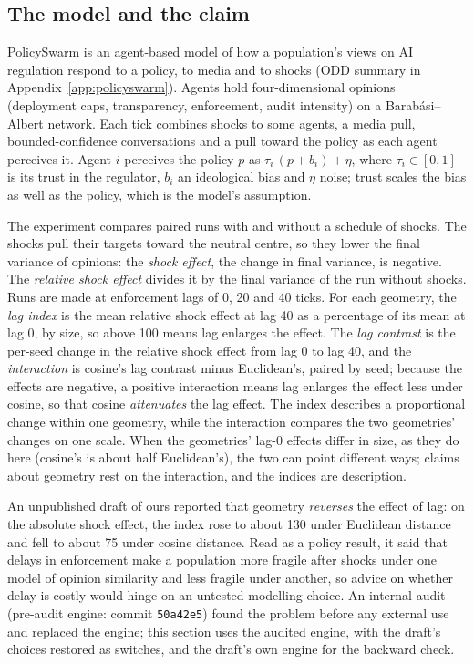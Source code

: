 \documentclass[11pt]{article}
\begin{document}
\subsection{The model and the claim}
PolicySwarm \citep{policyswarm} is an agent-based model of how a population's views on AI regulation respond to a policy, to media and to shocks (ODD summary in Appendix~\ref{app:policyswarm}).
Agents hold four-dimensional opinions (deployment caps, transparency, enforcement, audit intensity) on a Barab\'asi--Albert network.
Each tick combines shocks to some agents, a media pull, bounded-confidence conversations and a pull toward the policy as each agent perceives it.
Agent $i$ perceives the policy $p$ as $\tau_i\,(p + b_i) + \eta$, where $\tau_i \in [0,1]$ is its trust in the regulator, $b_i$ an ideological bias and $\eta$ noise; trust scales the bias as well as the policy, which is the model's assumption.

The experiment compares paired runs with and without a schedule of shocks.
The shocks pull their targets toward the neutral centre, so they lower the final variance of opinions: the \emph{shock effect}, the change in final variance, is negative.
The \emph{relative shock effect} divides it by the final variance of the run without shocks.
Runs are made at enforcement lags of 0, 20 and 40 ticks.
For each geometry, the \emph{lag index} is the mean relative shock effect at lag 40 as a percentage of its mean at lag 0, by size, so above 100 means lag enlarges the effect.
The \emph{lag contrast} is the per-seed change in the relative shock effect from lag 0 to lag 40, and the \emph{interaction} is cosine's lag contrast minus Euclidean's, paired by seed; because the effects are negative, a positive interaction means lag enlarges the effect less under cosine, so that cosine \emph{attenuates} the lag effect.
The index describes a proportional change within one geometry, while the interaction compares the two geometries' changes on one scale.
When the geometries' lag-0 effects differ in size, as they do here (cosine's is about half Euclidean's), the two can point different ways; claims about geometry rest on the interaction, and the indices are description.

An unpublished draft of ours reported that geometry \emph{reverses} the effect of lag: on the absolute shock effect, the index rose to about 130 under Euclidean distance and fell to about 75 under cosine distance.
Read as a policy result, it said that delays in enforcement make a population more fragile after shocks under one model of opinion similarity and less fragile under another, so advice on whether delay is costly would hinge on an untested modelling choice.
An internal audit (pre-audit engine: commit \texttt{50a42e5}) found the problem before any external use and replaced the engine; this section uses the audited engine, with the draft's choices restored as switches, and the draft's own engine for the backward check.
\end{document}
